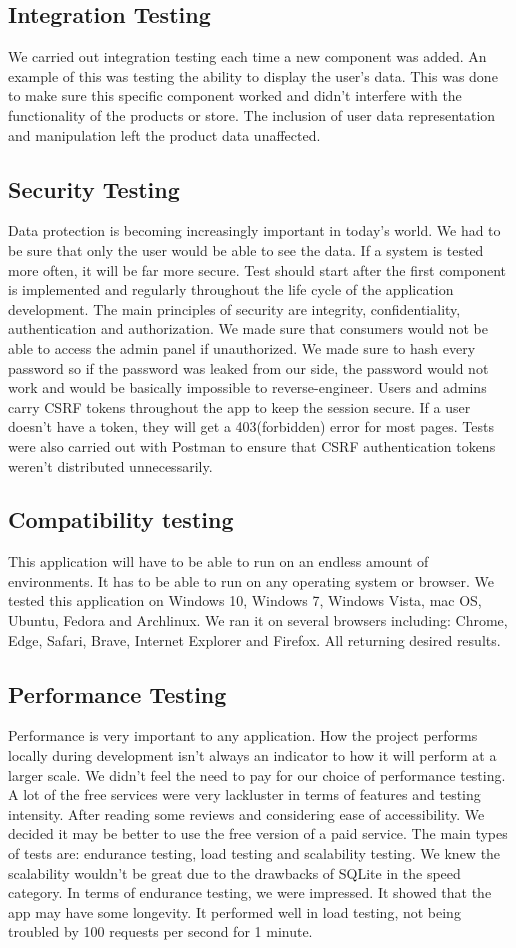\subsection{Integration Testing}
We carried out integration testing each time a new component was added. An example of this was testing the ability to display the user's data. This was done to make sure this specific component worked and didn't interfere with the functionality of the products or store. The inclusion of user data representation and manipulation left the product data unaffected.
\subsection{Security Testing}
Data protection is becoming increasingly important in today's world. We had to be sure that only the user would be able to see the data. If a system is tested more often, it will be far more secure. Test should start after the first component is implemented and regularly throughout the life cycle of the application development. The main principles of security are integrity, confidentiality, authentication and authorization. We made sure that consumers would not be able to access the admin panel if unauthorized. We made sure to hash every password so if the password was leaked from our side, the password would not work and would be basically impossible to reverse-engineer. Users and admins carry CSRF tokens throughout the app to keep the session secure. If a user doesn't have a token, they will get a 403(forbidden) error for most pages. Tests were also carried out with Postman to ensure that CSRF authentication tokens weren't distributed unnecessarily.
\subsection{Compatibility testing}
This application will have to be able to run on an endless amount of environments. It has to be able to run on any operating system or browser. We tested this application on Windows 10, Windows 7, Windows Vista, mac OS, Ubuntu, Fedora and Archlinux. We ran it on several browsers including: Chrome, Edge, Safari, Brave, Internet Explorer and Firefox. All returning desired results.
\subsection{Performance Testing}
Performance is very important to any application. How the project performs locally during development isn't always an indicator to how it will perform at a larger scale. We didn't feel the need to pay for our choice of performance testing. A lot of the free services were very lackluster in terms of features and testing intensity. After reading some reviews and considering ease of accessibility. We decided it may be better to use the free version of a paid service. The main types of tests are: endurance testing, load testing and scalability testing. We knew the scalability wouldn't be great due to the drawbacks of SQLite in the speed category. In terms of endurance testing, we were impressed. It showed that the app may have some longevity. It performed well in load testing, not being troubled by 100 requests per second for 1 minute.
